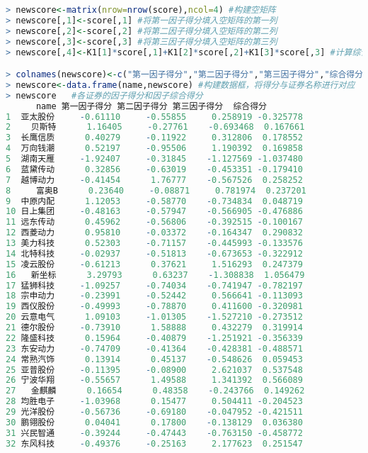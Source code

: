 \documentclass[11pt,a4paper,oneside]{book}
\begin{document}
\begin{lstlisting}[language=r]
> newscore<-matrix(nrow=nrow(score),ncol=4) #构建空矩阵
> newscore[,1]<-score[,1] #将第一因子得分填入空矩阵的第一列
> newscore[,2]<-score[,2] #将第二因子得分填入空矩阵的第二列
> newscore[,3]<-score[,3] #将第三因子得分填入空矩阵的第三列
> newscore[,4]<-K1[1]*score[,1]+K1[2]*score[,2]+K1[3]*score[,3] #计算综合得分

> colnames(newscore)<-c("第一因子得分","第二因子得分","第三因子得分","综合得分") #进行命名
> newscore<-data.frame(name,newscore) #构建数据框，将得分与证券名称进行对应
> newscore   #各证券的因子得分和因子综合得分
      name 第一因子得分 第二因子得分 第三因子得分  综合得分
1  亚太股份     -0.61110     -0.55855     0.258919 -0.325778
2    贝斯特      1.16405     -0.27761    -0.693468  0.167661
3  长鹰信质      0.40279     -0.11922     0.312806  0.178552
4  万向钱潮      0.52197     -0.95506     1.190392  0.169858
5  湖南天雁     -1.92407     -0.31845    -1.127569 -1.037480
6  蓝黛传动      0.32856     -0.63019    -0.453351 -0.179410
7  越博动力     -0.41454      1.76777    -0.567526  0.258252
8     富奥B      0.23640     -0.08871     0.781974  0.237201
9  中原内配      1.12053     -0.58770    -0.734834  0.048719
10 日上集团     -0.48163     -0.57947    -0.566905 -0.476886
11 远东传动      0.45962     -0.56806    -0.392515 -0.100167
12 西菱动力      0.95810     -0.03372    -0.164347  0.290832
13 美力科技      0.52303     -0.71157    -0.445993 -0.133576
14 北特科技     -0.02937     -0.51813    -0.673653 -0.322912
15 凌云股份     -0.61213      0.37621     1.516293  0.247379
16   新坐标      3.29793      0.63237    -1.308838  1.056479
17 猛狮科技     -1.09257     -0.74034    -0.741947 -0.782197
18 宗申动力     -0.23991     -0.52442     0.566641 -0.113093
19 西仪股份     -0.49993     -0.78870     0.411600 -0.320981
20 云意电气      1.09103     -1.01305    -1.527210 -0.273512
21 德尔股份     -0.73910      1.58888     0.432279  0.319914
22 隆盛科技      0.15964     -0.40879    -1.251921 -0.356339
23 东安动力     -0.74709     -0.41364    -0.428381 -0.488571
24 常熟汽饰      0.13914      0.45137    -0.548626  0.059453
25 亚普股份     -0.11395     -0.08900     2.621037  0.537548
26 宁波华翔     -0.55657      1.49588     1.341392  0.566089
27   金麒麟      0.16654      0.48358    -0.243766  0.149262
28 均胜电子     -1.03968      0.15477     0.504411 -0.204523
29 光洋股份     -0.56736     -0.69180    -0.047952 -0.421511
30 鹏翎股份      0.04041      0.17800    -0.138129  0.036380
31 兴民智通     -0.39244     -0.47443    -0.763150 -0.458772
32 东风科技     -0.49376     -0.25163     2.177623  0.251547

\end{lstlisting}
\end{document}
